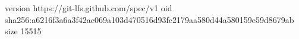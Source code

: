 version https://git-lfs.github.com/spec/v1
oid sha256:a6216f3a6a3f42ac069a103d470516d93fc2179aa580d44a580159e59d8679ab
size 15515
